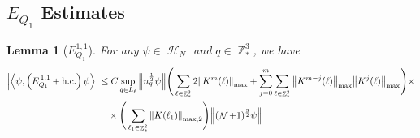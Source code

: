 \documentclass[sn-mathphys, Numbered ,a4paper]{sn-jnl}%
\DeclareMathOperator{\Z}{\mathbb{Z}}
\DeclareMathOperator{\HH}{\mathcal{H}}
\DeclareMathOperator{\NN}{\mathcal{N}}
\newcommand{\half}{\frac{1}{2}}
\newcommand{\eva}[1]{\left\langle #1 \right\rangle}
\theoremstyle{plain}
\newtheorem{lemma}[theorem]{Lemma}
\theoremstyle{definition}
\theoremstyle{remark}
\theoremstyle{plain}
\theoremstyle{definition}
\theoremstyle{remark}
\begin{document}
 \subsection{$E_{Q_1}$ Estimates}
\begin{lemma}[$E_{Q_1}^{1,1}$]
For any $\psi \in \HH_N$ and $q \in \Z^3_*$, we have
\begin{align}
     \abs{\eva{\psi,\left(E^{\,1,1}_{Q_1}+\mathrm{h.c.}\right) \psi }}\nonumber
     &\leq  C \sup\limits_{q \in L_\ell} \norm{n_{q}^{\half} \psi} \Bigg(\sum\limits_{\ell \in \Z^3_*} 2\norm{K^m(\ell)}_{\mathrm{max}} + \sum\limits_{j=0}^m \sum\limits_{\ell \in \Z^3_*}\norm{K^{m-j}(\ell)}_{\mathrm{max}}\norm{K^{j}(\ell)}_{\mathrm{max}}\Bigg)\times\\&\quad\times \Bigg( \sum\limits_{\ell_1 \in \Z^3_*}\norm{K(\ell_1)}_{\mathrm{max},2} \Bigg)  \norm { (\NN+1)^{\frac{3}{2}} \psi } \label{eq:estEQ111}
\end{align}
\end{lemma}
\end{document}
